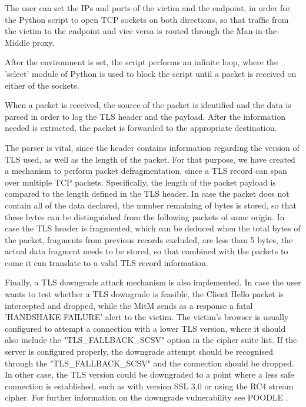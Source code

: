 
The user can set the IPs and ports of the victim and the endpoint, in order for
the Python script to open TCP sockets on both directions, so that traffic from
the victim to the endpoint and vice versa is routed through the
Man-in-the-Middle proxy.

After the environment is set, the script performs an infinite loop, where the
'select' module of Python is used to block the script until a packet is received
on either of the sockets.

When a packet is received, the source of the packet is identified and the data
is parsed in order to log the TLS header and the payload. After the information
needed is extracted, the packet is forwarded to the appropriate destination.

The parser is vital, since the header contains information regarding the version
of TLS used, as well as the length of the packet. For that purpose, we have
created a mechanism to perform packet defragmentation, since a TLS record can
span over multiple TCP packets. Specifically, the length of the packet payload
is compared to the length defined in the TLS header. In case the packet does not
contain all of the data declared, the number remaining of bytes is stored, so
that these bytes can be distinguished from the following packets of same origin.
In case the TLS header is fragmented, which can be deduced when the total bytes
of the packet, fragments from previous records excluded, are less than 5 bytes,
the actual data fragment needs to be stored, so that combined with the packets
to come it can translate to a valid TLS record information.

Finally, a TLS downgrade attack mechanism is also implemented. In case the user
wants to test whether a TLS downgrade is feasible, the Client Hello packet is
intercepted and dropped, while the MitM sends as a response a fatal 'HANDSHAKE
FAILURE' alert to the victim. The victim's browser is usually configured to
attempt a connection with a lower TLS version, where it should also include the
"TLS\_FALLBACK\_SCSV" option in the cipher suite list. If the server is
configured properly, the downgrade attempt should be recognised through the
"TLS\_FALLBACK\_SCSV" and the connection should be dropped. In other case, the
TLS version could be downgraded to a point where a less safe connection is
established, such as with version SSL 3.0 or using the RC4 stream cipher. For
further information on the downgrade vulnerability see POODLE \cite{poodle}.

